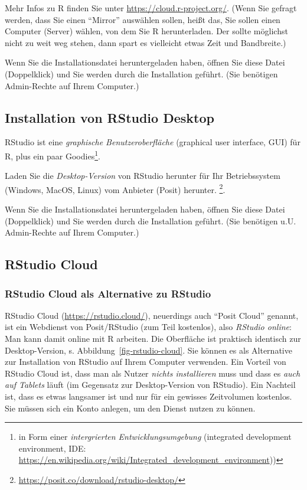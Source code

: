 \documentclass[
  letterpaper,
]{scrbook}
\theoremstyle{definition}
\theoremstyle{definition}
\theoremstyle{definition}
\theoremstyle{remark}
\begin{document}
Mehr Infos zu R finden Sie unter \url{https://cloud.r-project.org/}.
(Wenn Sie gefragt werden, dass Sie einen ``Mirror'' auswählen sollen,
heißt das, Sie sollen einen Computer (Server) wählen, von dem Sie R
herunterladen. Der sollte möglichst nicht zu weit weg stehen, dann spart
es vielleicht etwas Zeit und Bandbreite.)

Wenn Sie die Installationsdatei heruntergeladen haben, öffnen Sie diese
Datei (Doppelklick) und Sie werden durch die Installation geführt. (Sie
benötigen Admin-Rechte auf Ihrem Computer.)

\subsection{Installation von RStudio
Desktop}\label{installation-von-rstudio-desktop}

RStudio ist eine \emph{graphische Benutzeroberfläche} (graphical user
interface, GUI) für R, plus ein paar Goodies\footnote{in Form einer
  \emph{intergrierten Entwicklungsumgebung} (integrated development
  environment, IDE:
  \url{https://en.wikipedia.org/wiki/Integrated_development_environment}))}.

Laden Sie die \emph{Desktop-Version} von RStudio herunter für Ihr
Betriebssystem (Windows, MacOS, Linux) vom Anbieter (Posit) herunter.
\footnote{\url{https://posit.co/download/rstudio-desktop/}}.

Wenn Sie die Installationsdatei heruntergeladen haben, öffnen Sie diese
Datei (Doppelklick) und Sie werden durch die Installation geführt. (Sie
benötigen u.U. Admin-Rechte auf Ihrem Computer.)

\subsection{RStudio Cloud}\label{rstudio-cloud}

\subsubsection{RStudio Cloud als Alternative zu
RStudio}\label{rstudio-cloud-als-alternative-zu-rstudio}

RStudio Cloud (\url{https://rstudio.cloud/}), neuerdings auch ``Posit
Cloud'' genannt, ist ein Webdienst von Posit/RStudio (zum Teil
kostenlos), also \emph{RStudio online}: Man kann damit online mit R
arbeiten. Die Oberfläche ist praktisch identisch zur Desktop-Version, s.
Abbildung~\ref{fig-rstudio-cloud}. Sie können es als Alternative zur
Installation von RStudio auf Ihrem Computer verwenden. Ein Vorteil von
RStudio Cloud ist, dass man als Nutzer \emph{nichts installieren} muss
und dass es \emph{auch auf Tablets} läuft (im Gegensatz zur
Desktop-Version von RStudio). Ein Nachteil ist, dass es etwas langsamer
ist und nur für ein gewisses Zeitvolumen kostenlos. Sie müssen sich ein
Konto anlegen, um den Dienst nutzen zu können.
\end{document}
